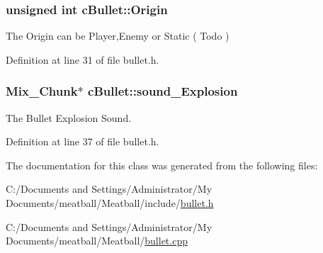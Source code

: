 \hypertarget{classc_bullet_a66bf644008f15b642e59514778d0dd42}{
\subsubsection[{Origin}]{\setlength{\rightskip}{0pt plus 5cm}unsigned int c\-Bullet\-::\-Origin}}\label{classc_bullet_a66bf644008f15b642e59514778d0dd42}


The Origin can be Player,Enemy or Static ( Todo ) 



Definition at line 31 of file bullet.\-h.

\hypertarget{classc_bullet_a05793bd5f273e252f3f491c532d45be1}{
\subsubsection[{sound\-\_\-\-Explosion}]{\setlength{\rightskip}{0pt plus 5cm}Mix\-\_\-\-Chunk$\ast$ c\-Bullet\-::sound\-\_\-\-Explosion}}\label{classc_bullet_a05793bd5f273e252f3f491c532d45be1}


The Bullet Explosion Sound. 



Definition at line 37 of file bullet.\-h.



The documentation for this class was generated from the following files\-:\begin{DoxyCompactItemize}
\item 
C\-:/\-Documents and Settings/\-Administrator/\-My Documents/meatball/\-Meatball/include/\hyperlink{bullet_8h}{bullet.\-h}\item 
C\-:/\-Documents and Settings/\-Administrator/\-My Documents/meatball/\-Meatball/\hyperlink{bullet_8cpp}{bullet.\-cpp}\end{DoxyCompactItemize}
